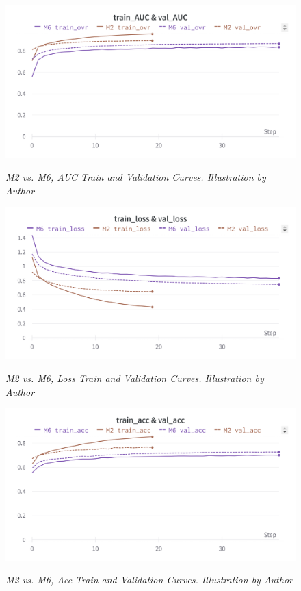 \begin{figure}[H]
\centering
    \includegraphics[width=\textwidth]{imatges/results/AUCM2M6.png}
\caption[M2 vs. M6, AUC Train and Validation Curves]{\textit{M2 vs. M6, AUC Train and Validation Curves. Illustration by Author}}
{\label{fig:aucm0m4}}
\end{figure}

\newpage

\begin{figure}[H]
\centering
    \includegraphics[width=\textwidth]{imatges/results/LossM2M6.png}
\caption[M2 vs. M6, Loss Train and Validation Curves]{\textit{M2 vs. M6, Loss Train and Validation Curves. Illustration by Author}}
{\label{fig:lossm0m4}}
\end{figure}


\begin{figure}[H]
\centering
    \includegraphics[width=\textwidth]{imatges/results/AccM2M6.png}
\caption[M2 vs. M6, Acc Train and Validation Curves]{\textit{M2 vs. M6, Acc Train and Validation Curves. Illustration by Author}}
{\label{fig:accm0m4}}
\end{figure}

